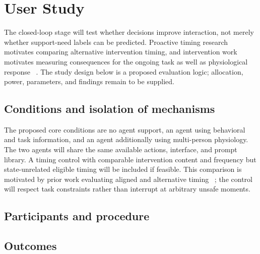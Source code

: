 \section{User Study}
\label{sec:8}

The closed-loop stage will test whether decisions improve interaction, not merely whether support-need labels can be predicted. Proactive timing research motivates comparing alternative intervention timing, and intervention work motivates measuring consequences for the ongoing task as well as physiological response ~\cite{sensing,calm}. The study design below is a proposed evaluation logic; allocation, power, parameters, and findings remain to be supplied.

\subsection{Conditions and isolation of mechanisms}

The proposed core conditions are no agent support, an agent using behavioral and task information, and an agent additionally using multi-person physiology. The two agents will share the same available actions, interface, and prompt library. A timing control with comparable intervention content and frequency but state-unrelated eligible timing will be included if feasible. This comparison is motivated by prior work evaluating aligned and alternative timing ~\cite{sensing}; the control will respect task constraints rather than interrupt at arbitrary unsafe moments.


\subsection{Participants and procedure}


\subsection{Outcomes}

